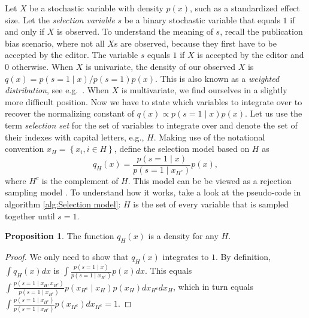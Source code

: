 \documentclass{article}
\theoremstyle{plain}
\theoremstyle{definition}
\newtheorem{prop}[theorem]{Proposition}
\begin{document}
Let $X$ be a stochastic variable with density $p(x)$, such as a standardized effect size. Let the \emph{selection variable} $s$ be a binary stochastic variable that equals $1$ if and only if $X$ is observed. To understand the meaning of $s$, recall the publication bias scenario, where not all $X$s are observed, because they first have to be accepted by the editor. The variable $s$ equals $1$ if $X$ is accepted by the editor and $0$ otherwise. When $X$ is univariate, the density of our observed $X$ is $q(x)=p\left(s=1\mid x\right)/p\left(s=1\right)p\left(x\right)$. This is also known as a \emph{weighted distribution}, see e.g.\ \citep[][eq. 3.1]{rao1985weighted}. When $X$ is multivariate, we find ourselves in a slightly more difficult position. Now we have to state which variables to integrate over to recover the normalizing constant of $q\left(x\right)\propto p\left(s=1\mid x\right)p\left(x\right)$. Let us use the term \emph{selection set} for the set of variables to integrate over and denote the set of their indexes with capital letters, e.g., $H$. Making use of the notational convention $x_{H}=\left\{ x_{i},i\in H\right\}$, define the selection model based on $H$ as
\begin{equation}
q_{H}(x)=\frac{p(s=1\mid x)}{p(s=1\mid x_{H^{c}})}p(x)\label{eq:H-selection model},
\end{equation}
where $H^c$ is the complement of $H$. This model can be be viewed as a rejection sampling model \citep{von1951various}. To understand how it works, take a look at the pseudo-code in algorithm \ref{alg:Selection model}: $H$ is the set of every variable that is sampled together until $s=1$.

\begin{prop}
The function $q_{H}\left(x\right)$ is a density for any $H$.
\end{prop}
\begin{proof}
We only need to show that $q_{H}\left(x\right)$ integrates to $1$. By definition, $\int q_{H}\left(x\right)dx$ is $\int\frac{p\left(s=1\mid x\right)}{p\left(s=1\mid x_{H^{c}}\right)}p\left(x\right)dx.$ This equals $\int\frac{p\left(s=1\mid x_{H},x_{H^{c}}\right)}{p\left(s=1\mid x_{H^{c}}\right)}p\left(x_{H^{c}}\mid x_{H}\right)p\left(x_{H}\right)dx_{H^{c}}dx_{H}$,
which in turn equals $\int\frac{p\left(s=1\mid x_{H^{c}}\right)}{p\left(s=1\mid x_{H^{c}}\right)}p\left(x_{H^{c}}\right)dx_{H^{c}}=1$.
\end{proof}
\end{document}
